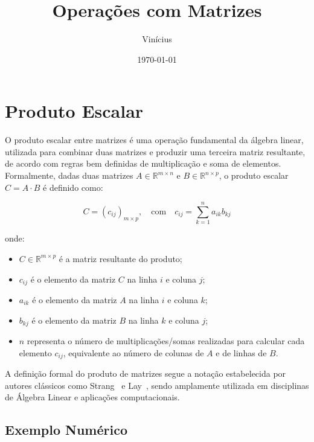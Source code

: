 \documentclass[11pt,a4paper]{article}
\title{Operações com Matrizes}
\author{Vinícius}
\date{\today}
\begin{document}
\maketitle
\tableofcontents
\newpage


\section{Produto Escalar}

O produto escalar entre matrizes é uma operação fundamental da álgebra linear, utilizada para combinar duas matrizes e produzir uma terceira matriz resultante, de acordo com regras bem definidas de multiplicação e soma de elementos. Formalmente, dadas duas matrizes \( A \in \mathbb{R}^{m \times n} \) e \( B \in \mathbb{R}^{n \times p} \), o produto escalar \( C = A \cdot B \) é definido como:

\begin{equation}
	C = \left( c_{ij} \right)_{m \times p}, \quad \text{com} \quad c_{ij} = \sum_{k=1}^{n} a_{ik} b_{kj}
	\label{eq:produto_escalar}
\end{equation}

onde:
\begin{itemize}
	\item \( C \in \mathbb{R}^{m \times p} \) é a matriz resultante do produto;
	\item \( c_{ij} \) é o elemento da matriz \( C \) na linha \( i \) e coluna \( j \);
	\item \( a_{ik} \) é o elemento da matriz \( A \) na linha \( i \) e coluna \( k \);
	\item \( b_{kj} \) é o elemento da matriz \( B \) na linha \( k \) e coluna \( j \);
	\item \( n \) representa o número de multiplicações/somas realizadas para calcular cada elemento \( c_{ij} \), equivalente ao número de colunas de \( A \) e de linhas de \( B \).
\end{itemize}

A definição formal do produto de matrizes segue a notação estabelecida por autores clássicos como Strang~\cite{strang2022introduction} e Lay~\cite{lay2003linear}, sendo amplamente utilizada em disciplinas de Álgebra Linear e aplicações computacionais.

\subsection{Exemplo Numérico}
\end{document}
